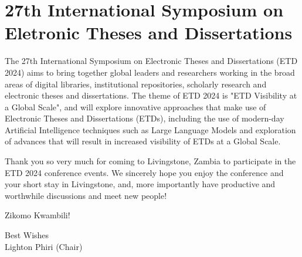 \section{27th International Symposium on Eletronic Theses and Dissertations}
The 27th International Symposium on Electronic Theses and Dissertations (ETD 2024) aims to bring together global leaders and researchers working in the broad areas of digital libraries, institutional repositories, scholarly research and electronic theses and dissertations. The theme of ETD 2024 is "ETD Visibility at a Global Scale", and will explore innovative approaches that make use of Electronic Theses and Dissertations (ETDs), including the use of modern-day Artificial Intelligence techniques such as Large Language Models and exploration of advances that will result in increased visibility of ETDs at a Global Scale.

Thank you so very much for coming to Livingstone, Zambia to participate in the ETD 2024 conference events. We sincerely hope you enjoy the conference and your short stay in Livingstone, and, more importantly have productive and worthwhile discussions and meet new people!

Zikomo Kwambili!

\begin{minipage}[t]{\textwidth}
\raggedleft
Best Wishes\\
Lighton Phiri (Chair)
\end{minipage}

\newpage
